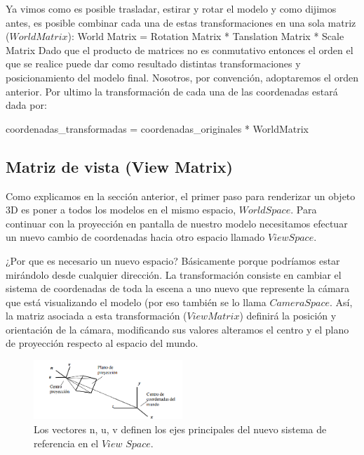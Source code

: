 \documentclass[a4paper]{article}
\begin{document}
\par Ya vimos como es posible trasladar, estirar y rotar el modelo y como dijimos antes, es posible combinar cada una de estas transformaciones en una sola matriz ($World Matrix$): \newline
World Matrix = Rotation Matrix * Tanslation Matrix * Scale Matrix\newline  \newline
 Dado que el producto de matrices no es conmutativo entonces el orden el que se realice puede dar como resultado distintas transformaciones y posicionamiento del modelo final. Nosotros, por convención, adoptaremos el orden anterior.
Por ultimo la transformación de cada una de las coordenadas estará dada por: \newline

coordenadas\_transformadas = coordenadas\_originales * WorldMatrix 


\subsection{Matriz de vista (View Matrix)}
Como explicamos en la sección anterior, el primer paso para  renderizar un objeto 3D  es poner a todos los modelos en el mismo espacio, $World Space$. Para continuar con la proyección en pantalla de nuestro modelo necesitamos efectuar un nuevo cambio de coordenadas hacia otro espacio llamado $View Space$.

\par ¿Por que es necesario un nuevo espacio? Básicamente porque podríamos estar mirándolo desde cualquier dirección. La transformación consiste en cambiar el sistema de coordenadas de toda la escena a uno nuevo que represente la cámara que está visualizando el modelo (por eso también se lo llama $Camera Space$. Así, la matriz asociada a esta transformación ($View Matrix$) definirá la posición y orientación de la cámara, modificando sus valores alteramos el centro y el plano de proyección respecto al espacio del mundo. 
\begin{figure}[h!]
    \centering
    \includegraphics[width=0.50\textwidth]{Imagenes/a.png}
    \caption{Los vectores n, u, v definen los ejes principales del nuevo sistema de referencia en el $View$ $Space$.}
    \label{fig:mesh1}
\end{figure}
\end{document}
